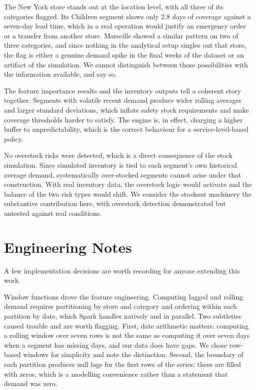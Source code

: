 \documentclass[11pt,a4paper]{article}
\begin{document}
The New York store stands out at the location level, with all three of its categories flagged. Its Children segment shows only 2.8 days of coverage against a seven-day lead time, which in a real operation would justify an emergency order or a transfer from another store. Marseille showed a similar pattern on two of three categories, and since nothing in the analytical setup singles out that store, the flag is either a genuine demand spike in the final weeks of the dataset or an artifact of the simulation. We cannot distinguish between those possibilities with the information available, and say so.

The feature importance results and the inventory outputs tell a coherent story together. Segments with volatile recent demand produce wider rolling averages and larger standard deviations, which inflate safety stock requirements and make coverage thresholds harder to satisfy. The engine is, in effect, charging a higher buffer to unpredictability, which is the correct behaviour for a service-level-based policy.

No overstock risks were detected, which is a direct consequence of the stock simulation. Since simulated inventory is tied to each segment's own historical average demand, systematically over-stocked segments cannot arise under that construction. With real inventory data, the overstock logic would activate and the balance of the two risk types would shift. We consider the stockout machinery the substantive contribution here, with overstock detection demonstrated but untested against real conditions.

\section{Engineering Notes}\label{sec:engineering}

A few implementation decisions are worth recording for anyone extending this work.

Window functions drove the feature engineering. Computing lagged and rolling demand requires partitioning by store and category and ordering within each partition by date, which Spark handles natively and in parallel. Two subtleties caused trouble and are worth flagging. First, date arithmetic matters: computing a rolling window over seven rows is not the same as computing it over seven days when a segment has missing days, and our data does have gaps. We chose row-based windows for simplicity and note the distinction. Second, the boundary of each partition produces null lags for the first rows of the series; these are filled with zeros, which is a modelling convenience rather than a statement that demand was zero.
\end{document}
